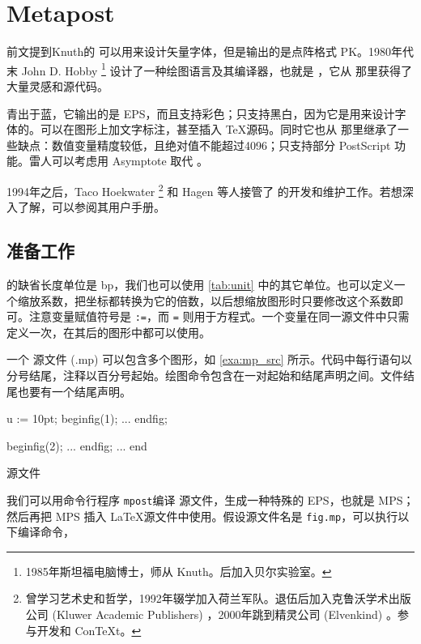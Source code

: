 \chapter{Metapost}
\label{sec:mp}

前文提到Knuth的 \MF 可以用来设计矢量字体，但是输出的是点阵格式 PK。1980年代末 John D. Hobby\indexHobby{} \footnote{1985年斯坦福电脑博士，师从 Knuth。后加入贝尔实验室。} 设计了一种绘图语言及其编译器，也就是 \MP ，它从 \MF 那里获得了大量灵感和源代码。

\MP 青出于蓝，它输出的是 EPS，而且支持彩色；\MF 只支持黑白，因为它是用来设计字体的。\MP 可以在图形上加文字标注，甚至插入 \TeX 源码。同时它也从 \MF 那里继承了一些缺点：数值变量精度较低，且绝对值不能超过4096；只支持部分 PostScript 功能。雷人可以考虑用 Asymptote 取代 \MP。

1994年之后，Taco Hoekwater\indexHoekwater{} \footnote{曾学习艺术史和哲学，1992年辍学加入荷兰军队。退伍后加入克鲁沃学术出版公司 (Kluwer Academic Publishers) ，2000年跳到精灵公司 (Elvenkind) 。参与开发\LuaTeX{}和 Con\TeX t。} 和 Hagen 等人接管了 \MP 的开发和维护工作。若想深入了解，可以参阅其用户手册\citep{Hobby_metapost}。

\section{准备工作}

\MP 的缺省长度单位是 bp，我们也可以使用 \autoref{tab:unit} 中的其它单位。也可以定义一个缩放系数，把坐标都转换为它的倍数，以后想缩放图形时只要修改这个系数即可。注意变量赋值符号是 \texttt{:=}，而 \texttt{=} 则用于方程式。一个变量在同一源文件中只需定义一次，在其后的图形中都可以使用。

一个 \MP 源文件 (.mp) 可以包含多个图形，如 \autoref{exa:mp_src} 所示。代码中每行语句以分号结尾，注释以百分号起始。绘图命令包含在一对起始和结尾声明之间。文件结尾也要有一个结尾声明。

\begin{example}[h]
\begin{Code}[numbers=left]
u := 10pt;   %
beginfig(1); %
...          %
endfig;      %

beginfig(2);
...
endfig;
...
end          %
\end{Code}
\caption{\MP 源文件}
\label{exa:mp_src}
\end{example}

我们可以用命令行程序 \texttt{mpost}编译 \MP 源文件，生成一种特殊的 EPS，也就是 MPS；然后再把 MPS 插入 \LaTeX 源文件中使用。假设源文件名是 \texttt{fig.mp}，可以执行以下编译命令，

